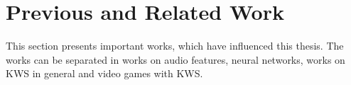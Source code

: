 
\chapter{Previous and Related Work}\label{sec:prev}
\thesisStateRevised
This section presents important works, which have influenced this thesis.
The works can be separated in works on audio features, neural networks, works on KWS in general and video games with KWS.







